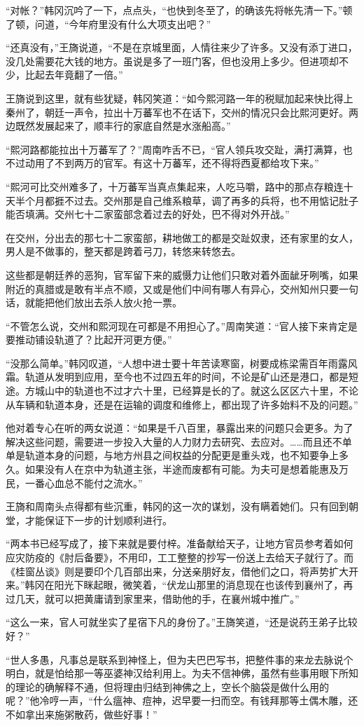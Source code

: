 “对帐？”韩冈沉吟了一下，点点头，“也快到冬至了，的确该先将帐先清一下。”顿了顿，问道，“今年府里没有什么大项支出吧？”

“还真没有，”王旖说道，“不是在京城里面，人情往来少了许多。又没有添丁进口，没几处需要花大钱的地方。虽说是多了一班门客，但也没用上多少。但进项却不少，比起去年竟翻了一倍。”

王旖说到这里，就有些犹疑，韩冈笑道：“如今熙河路一年的税赋加起来快比得上秦州了，朝廷一声令，拉出十万蕃军也不在话下，交州的情况只会比熙河更好。两边既然发展起来了，顺丰行的家底自然是水涨船高。”

“熙河路都能拉出十万蕃军了？”周南咋舌不已，“官人领兵攻交趾，满打满算，也不过动用了不到两万的官军。有这十万蕃军，还不得将西夏都给攻下来。”

“熙河可比交州难多了，十万蕃军当真点集起来，人吃马嚼，路中的那点存粮连十天半个月都捱不过去。交州那是自己维系粮草，调了再多的兵将，也不用惦记肚子能否填满。交州七十二家蛮部念着过去的好处，巴不得对外开战。”

在交州，分出去的那七十二家蛮部，耕地做工的都是交趾奴隶，还有家里的女人，男人是不做事的，整天都是跨着弓刀，转悠来转悠去。

这些都是朝廷养的恶狗，官军留下来的威慑力让他们只敢对着外面龇牙咧嘴，如果附近的真腊或是敢有半点不顺，又或是他们中间有哪人有异心，交州知州只要一句话，就能把他们放出去杀人放火抢一票。

“不管怎么说，交州和熙河现在可都是不用担心了。”周南笑道：“官人接下来肯定是要推动铺设轨道了？比起开河更方便。”

“没那么简单。”韩冈叹道，“人想中进士要十年苦读寒窗，树要成栋梁需百年雨露风霜。轨道从发明到应用，至今也不过四五年的时间，不论是矿山还是港口，都是短途。方城山中的轨道也不过才六十里，已经算是长的了。就这么区区六十里，不论从车辆和轨道本身，还是在运输的调度和维修上，都出现了许多始料不及的问题。”

他对着专心在听的两女说道：“如果是千八百里，暴露出来的问题只会更多。为了解决这些问题，需要进一步投入大量的人力财力去研究、去应对。……而且还不单单是轨道本身的问题，与地方州县之间权益的分配更是重头戏，也不知要争上多久。如果没有人在京中为轨道主张，半途而废都有可能。为夫可是想着能惠及万民，一番心血总不能付之流水。”

王旖和周南头点得都有些沉重，韩冈的这一次的谋划，没有瞒着她们。只有回到朝堂，才能保证下一步的计划顺利进行。

“两本书已经写成了，接下来就是要付梓。准备献给天子，让地方官员参考着如何应灾防疫的《肘后备要》，不用印，工工整整的抄写一份送上去给天子就行了。而《桂窗丛谈》则是要印个几百部出来，分送亲朋好友，借他们之口，将声势扩大开来。”韩冈在阳光下眯起眼，微笑着，“伏龙山那里的消息现在也该传到襄州了，再过几天，就可以把黄庸请到家里来，借助他的手，在襄州城中推广。”

“这么一来，官人可就坐实了星宿下凡的身份了。”王旖笑道，“还是说药王弟子比较好？”

“世人多愚，凡事总是联系到神怪上，但为夫巴巴写书，把整件事的来龙去脉说个明白，就是怕给那一等巫婆神汉给利用上。为夫不信神佛，虽然有些事用眼下所知的理论的确解释不通，但将理由归结到神佛之上，空长个脑袋是做什么用的呢？”他冷哼一声，“什么瘟神、痘神，迟早要一扫而空。有钱拜那等土偶木雕，还不如拿出来施粥散药，做些好事！”

